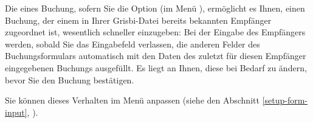 Die  eines Buchung, sofern Sie die Option  (im Menü ), ermöglicht es Ihnen, einen Buchung, der einem in Ihrer Grisbi-Datei bereits bekannten Empfänger zugeordnet ist, wesentlich schneller einzugeben: Bei der Eingabe des Empfängers werden, sobald Sie das Eingabefeld verlassen, die anderen Felder des Buchungsformulars automatisch mit den Daten des zuletzt für diesen Empfänger eingegebenen Buchungs ausgefüllt. Es liegt an Ihnen, diese bei Bedarf zu ändern, bevor Sie den Buchung bestätigen.

Sie können dieses Verhalten im Menü  anpassen (siehe den Abschnitt \vref{setup-form-input}, ).

